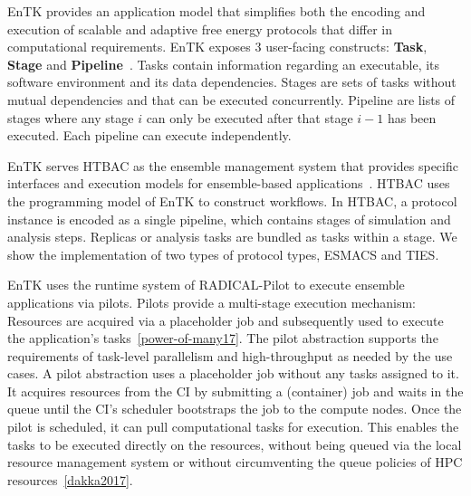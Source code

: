 EnTK provides an application model that simplifies both the encoding and
execution of scalable and adaptive free energy protocols that differ in
computational requirements. EnTK exposes 3 user-facing constructs:
\textbf{Task}, \textbf{Stage} and \textbf{Pipeline}~\cite{power-of-many17}.
Tasks contain information regarding an executable, its software environment
and its data dependencies. Stages are sets of tasks without mutual
dependencies and that can be executed concurrently. Pipeline are lists of
stages where any stage $i$ can only be executed after that stage $i - 1$ has
been executed. Each pipeline can execute independently.

EnTK serves HTBAC as the ensemble management system that provides specific
interfaces and execution models for ensemble-based
applications~\cite{power-of-many17}. HTBAC uses the programming model of EnTK
to construct workflows. In HTBAC, a protocol instance is encoded as a single
pipeline, which contains stages of simulation and analysis steps. Replicas or
analysis tasks are bundled as tasks within a stage. We show the
implementation of two types of protocol types, ESMACS and TIES.

EnTK uses the runtime system of RADICAL-Pilot to execute ensemble applications 
via pilots. Pilots provide a multi-stage execution mechanism: Resources are 
acquired via a placeholder job and subsequently used to execute the 
application’s tasks~\ref{power-of-many17}. The pilot abstraction supports the 
requirements of task-level parallelism and high-throughput as needed by the use 
cases. A pilot abstraction uses a placeholder job without any tasks assigned to 
it. It acquires resources from the CI by submitting a (container) job and waits 
in the queue until the CI's scheduler bootstraps the job to the compute nodes. 
Once the pilot is scheduled, it can pull computational tasks for execution. 
This enables the tasks to be executed directly on the resources, without being 
queued via the local resource management system or without circumventing the 
queue policies of HPC resources~\ref{dakka2017}. 




